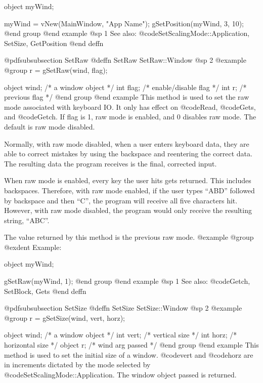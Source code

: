 object  myWind;

myWind = vNew(MainWindow, "App Name");
gSetPosition(myWind, 3, 10);
@end group
@end example
@sp 1
See also:  @code{SetScalingMode::Application, SetSize, GetPosition}
@end deffn











@pdfsubsubsection {SetRaw}
@deffn {SetRaw} SetRaw::Window
@sp 2
@example
@group
r = gSetRaw(wind, flag);

object  wind;   /*  a window object     */
int     flag;   /*  enable/disable flag */
int     r;      /*  previous flag       */
@end group
@end example
This method is used to set the raw mode associated with keyboard
IO.  It only has effect on @code{Read}, @code{Gets}, and @code{Getch}.
If flag is 1, raw mode is enabled, and 0 disables raw mode.  The
default is raw mode disabled.

Normally, with raw mode disabled, when a user enters keyboard data,
they are able to correct mistakes by using the backspace and reentering
the correct data.  The resulting data the program receives is the
final, corrected input.

When raw mode is enabled, every key the user hits gets returned.  This
includes backspaces.  Therefore, with raw mode enabled, if the user types
``ABD'' followed by backspace and then ``C'', the program will receive all
five characters hit.  However, with raw mode disabled, the program would
only receive the resulting string, ``ABC''.

The value returned by this method is the previous raw mode.
@example
@group
@exdent Example:

object  myWind;

gSetRaw(myWind, 1);
@end group
@end example
@sp 1
See also:  @code{Getch, SetBlock, Gets}
@end deffn











@pdfsubsubsection {SetSize}
@deffn {SetSize} SetSize::Window
@sp 2
@example
@group
r = gSetSize(wind, vert, horz);

object  wind;   /*  a window object     */
int     vert;   /*  vertical size       */
int     horz;   /*  horizontal size     */
object  r;      /*  wind arg passed     */
@end group
@end example
This method is used to set the initial size of a window.
@code{vert} and @code{horz} are in increments dictated by the
mode selected by @code{SetScalingMode::Application}.  The window
object passed is returned.

